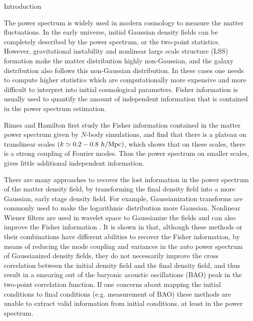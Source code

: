 \begin{section}{Introduction}\label{sec:introduction}  

The power spectrum is widely used in modern cosmology to measure the matter
fluctuations. In the early universe, initial Gaussian density fields
can be completely described by the power spectrum, or the two-point
statistics. However, gravitational instability and nonlinear large scale
structure (LSS) formation make the matter distribution highly
non-Gaussian, and the galaxy distribution also follows this non-Gaussian
distribution. In these cases one needs to compute higher statistics
which are computationally more expensive and more difficult to
interpret into initial cosmological parameters. Fisher information
is usually used to quantify the amount of independent information
that is contained in the power spectrum estimation.

Rimes and Hamilton \citep{bib:Rimes2006} first study the Fisher
information contained in the matter power
spectrum given by $N$-body simulations, and find that there is a
plateau on translinear scales $(k \simeq 0.2-0.8\ h/{\rm Mpc})$,
which shows that on these scales, there is a strong coupling of
Fourier modes. Thus the power spectrum on smaller scales, gives little
additional independent information.

There are many approaches to recover the lost information in the
power spectrum of the matter density field, by transforming the final
density field into a more Gaussian, early stage density field.
For example, Gaussianization transforms are commonly used
\cite{bib:Weinberg1992,bib:Mark2009} to make the logarithmic
distribution more Gaussian. Nonlinear Wiener filters are used
in wavelet space to Gaussianize the fields and can also improve
the Fisher information \cite{bib:Zhang2011,bib:Yu2012,bib:HarnoisD2013}.
It is shown in \cite{bib:HarnoisD2013} that, although these methods
or their combinations have different abilities to recover
the Fisher information, by means of reducing the mode coupling
and variances in the auto power spectrum of Gaussianized
density fields, they do not necessarily improve the cross correlation
 between the initial density
field and the final density field, and thus result in a smearing
out of the baryonic acoustic oscillations (BAO) peak in the two-point
correlation function. If one concerns about mapping
the initial conditions to final conditions (e.g. measurement of 
BAO) these methods are unable to
extract valid information from initial conditions, at least in
the power spectrum.


\end{section}
